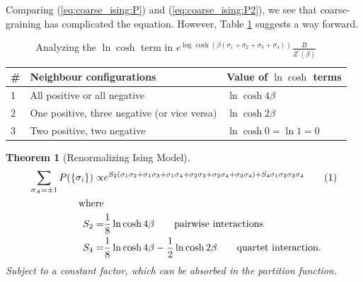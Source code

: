 \documentclass[]{article}
\newcommand\numberthis{\addtocounter{equation}{1}\tag{\theequation}}
\newtheorem{thm}{Theorem}
\begin{document}
Comparing (\ref{eq:coarse_ising:P}) and (\ref{eq:coarse_ising:P2}), we see that coarse-graining has complicated the equation. However, Table \ref{table:ising-cosh} suggests a way forward.

\begin{table}[H]
	\begin{center}
		\caption[Analyzing the $\ln \cosh$ term]{Analyzing the $\ln \cosh$ term in $ e^{\log{\cosh({\beta(\sigma_1+\sigma_2+\sigma_3+\sigma_4)})}} \frac{B}{Z^\prime(\beta)}$}\label{table:ising-cosh}
		\begin{tabular}{|l|l|l|}\hline
			\#&Neighbour configurations&Value of $\ln \cosh$ terms\\\hline
			1&All positive or all negative&$\ln \cosh 4\beta$\\\hline
			2&One positive, three negative (or vice versa)&$\ln \cosh 2\beta$\\\hline
			3&Two positive, two negative&$\ln \cosh 0 = \ln 1 = 0$\\\hline
		\end{tabular}
	\end{center}
\end{table}

\begin{thm}[Renormalizing Ising Model]
	\begin{align*}
		\sum_{\sigma_A=\pm 1} P(\{\sigma_i\}) \propto&e^{S_2 (\sigma_1\sigma_2 + \sigma_1\sigma_3+ \sigma_1\sigma_4 + \sigma_2 \sigma_3 + \sigma_2 \sigma_4 +\sigma_3 \sigma_4) + S_4 \sigma_1 \sigma_2 \sigma_3 \sigma_4} \numberthis \label{eq:coupled:sigmas}\\
		 \text{where}\\
		S_2 =& \frac{1}{8} \ln{\cosh{4\beta}} \tag*{pairwise interactions}\\
		S_4 =& \frac{1}{8} \ln{\cosh{4\beta}} - \frac{1}{2} \ln{\cosh{2\beta}} \tag*{quartet interaction.}
	\end{align*}
		Subject to a constant factor, which can be absorbed in the partition function.
\end{thm}
\end{document}
